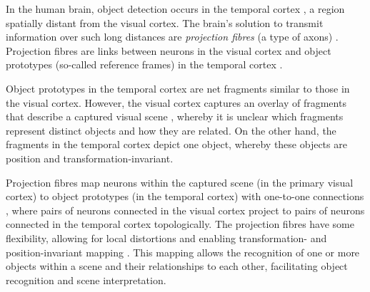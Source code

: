 In the human brain, object detection occurs in the temporal cortex \cite{miyashita_inferior_1993, conway_organization_2018}, a region spatially distant from the visual cortex.
The brain's solution to transmit information over such long distances are \emph{projection fibres} (a type of axons) \cite{tanigawa_organization_2005, greig_molecular_2013}.
Projection fibres are links between neurons in the visual cortex and object prototypes (so-called reference frames) in the temporal cortex \cite{goodale_separate_1992}.

Object prototypes in the temporal cortex are net fragments similar to those in the visual cortex. However, the visual cortex captures an overlay of fragments that describe a captured visual scene \cite{von_der_malsburg_theory_2022}, whereby it is unclear which fragments represent distinct objects and how they are related.
On the other hand, the fragments in the temporal cortex depict one object, whereby these objects are position and transformation-invariant.

Projection fibres map neurons within the captured scene (in the primary visual cortex) to object prototypes (in the temporal cortex) with one-to-one connections , where pairs of neurons connected in the visual cortex project to pairs of neurons connected in the temporal cortex topologically. The projection fibres have some flexibility, allowing for local distortions and enabling transformation- and position-invariant mapping . This mapping allows the recognition of one or more objects within a scene and their relationships to each other, facilitating object recognition and scene interpretation.

